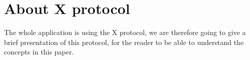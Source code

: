 \chapter{About X protocol}
\label{chap:about-x}
The whole application is using the X protocol\cite{x-protocol}, 
we are therefore going to give a brief presentation of this protocol, 
for the reader to be able to understand the concepts in this paper.
%

%

%

%

%

